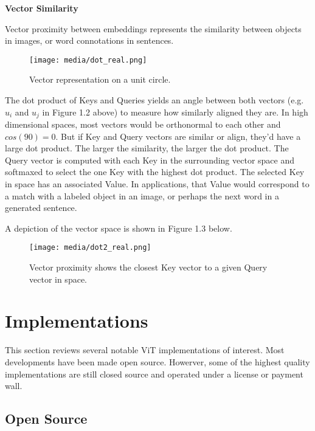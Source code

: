 \textbf{Vector Similarity}


Vector proximity between embeddings represents the similarity between objects in images, or 
word connotations in sentences.


\begin{figure}[H]
	\begin{center}
	\texttt{[image: media/dot\_real.png]}
	\end{center}
	\caption[Vector Representation]{Vector representation on a unit circle.}
	\end{figure}


The dot product of Keys and Queries yields an angle between both vectors (e.g. $u_i$ and $u_j$ in Figure 1.2 above) to measure 
how similarly aligned they are. In high dimensional spaces, most vectors would be orthonormal to each other
and $cos(90)=0$. But if Key and Query vectors are similar or align, they'd have a large dot product. 
The larger the similarity, the larger the dot product. 
The Query vector is computed with each Key in the surrounding vector space and softmaxed to 
select the one Key with the highest dot product.
The selected Key in space has an associated Value. In applications, that Value would correspond to 
a match with a labeled object in an image, or perhaps the next word in a generated sentence. 


A depiction of the vector space is shown in Figure 1.3 below.


\begin{figure}[H]
	\begin{center}
	\texttt{[image: media/dot2\_real.png]}
	\end{center}
	\caption[Key/Query Vector Proximity]{Vector proximity shows the closest Key vector to a given Query vector in space.}
	\end{figure}


\section{Implementations}


This section reviews several notable ViT implementations of interest.
Most developments have been made open source. Howerver, some of the 
highest quality implementations are still closed source and operated 
under a license or payment wall.

\subsection{Open Source}

